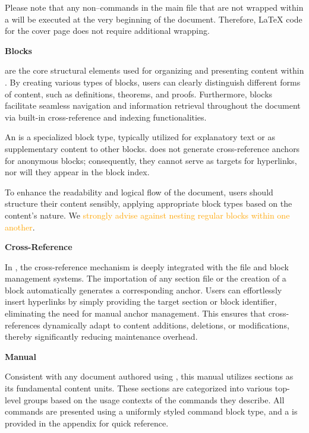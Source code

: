 Please note that any non--\!\SimpleSystemTeX commands in the main file that are not wrapped within a  will be executed at the very beginning of the document. Therefore, LaTeX code for the cover page does not require additional wrapping.

\medskip\textbf{Blocks}

 are the core structural elements used for organizing and presenting content within \SimpleSystemTeX. By creating various types of blocks, users can clearly distinguish different forms of content, such as definitions, theorems, and proofs. Furthermore, blocks facilitate seamless navigation and information retrieval throughout the document via built-in cross-reference and indexing functionalities.

An  is a specialized block type, typically utilized for explanatory text or as supplementary content to other blocks. \SimpleSystemTeX does not generate cross-reference anchors for anonymous blocks; consequently, they cannot serve as targets for hyperlinks, nor will they appear in the block index.

To enhance the readability and logical flow of the document, users should structure their content sensibly, applying appropriate block types based on the content's nature. We \textcolor{orange}{strongly advise against nesting regular blocks within one another}.

\medskip\textbf{Cross-Reference}

In \SimpleSystemTeX, the cross-reference mechanism is deeply integrated with the file and block management systems. The importation of any section file or the creation of a block automatically generates a corresponding anchor. Users can effortlessly insert hyperlinks by simply providing the target section or block identifier, eliminating the need for manual anchor management. This ensures that cross-references dynamically adapt to content additions, deletions, or modifications, thereby significantly reducing maintenance overhead.

\medskip\SimpleSystemTeX[bf]\textbf{Manual}

Consistent with any document authored using \SimpleSystemTeX, this manual utilizes sections as its fundamental content units. These sections are categorized into various top-level groups based on the usage contexts of the commands they describe. All commands are presented using a uniformly styled command block type, and a  is provided in the appendix for quick reference.

